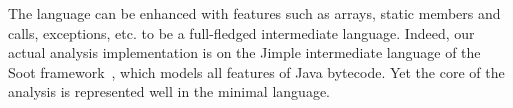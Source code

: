 The language can be enhanced with features such as arrays, static members and
calls, exceptions, etc. to be a full-fledged intermediate language.
Indeed, our actual analysis implementation is on the Jimple intermediate
language of the Soot framework~\cite{cascon:1999:Vall},%
which
models all features of Java bytecode. Yet the core of the analysis is
represented well in the minimal language.

